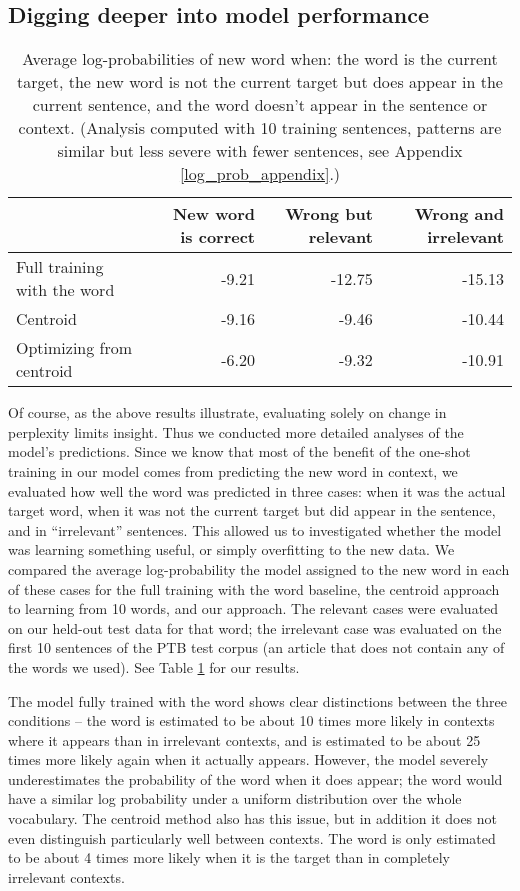 \documentclass{article}
\begin{document}
\subsection{Digging deeper into model performance} \label{digging_deeper}
\begin{table}[ht]
\centering
\begin{tabular}{|l|rrr|}
  \hline
  & New word is correct & Wrong but relevant & Wrong and irrelevant \\ 
  \hline
  Full training with the word & -9.21 & -12.75 & -15.13 \\ 
  Centroid & -9.16 & -9.46 & -10.44 \\ 
  Optimizing from centroid & -6.20 & -9.32 & -10.91 \\ 
   \hline
\end{tabular}
\caption{Average log-probabilities of new word when: the word is the current target, the new word is not the current target but does appear in the current sentence, and the word doesn't appear in the sentence or context. (Analysis computed with 10 training sentences, patterns are similar but less severe with fewer sentences, see Appendix \ref{log_prob_appendix}.)} \label{word_prob_table} 
\end{table}
Of course, as the above results illustrate, evaluating solely on change in perplexity limits insight. Thus we conducted more detailed analyses of the model's predictions. Since we know that most of the benefit of the one-shot training in our model comes from predicting the new word in context, we evaluated how well the word was predicted in three cases: when it was the actual target word, when it was not the current target but did appear in the sentence, and in ``irrelevant'' sentences. This allowed us to investigated whether the model was learning something useful, or simply overfitting to the new data. We compared the average log-probability the model assigned to the new word in each of these cases for the full training with the word baseline, the centroid approach to learning from 10 words, and our approach. The relevant cases were evaluated on our held-out test data for that word; the irrelevant case was evaluated on the first 10 sentences of the PTB test corpus (an article that does not contain any of the words we used). See Table \ref{word_prob_table} for our results. \par 
The model fully trained with the word shows clear distinctions between the three conditions -- the word is estimated to be about 10 times more likely in contexts where it appears than in irrelevant contexts, and is estimated to be about 25 times more likely again when it actually appears. However, the model severely underestimates the probability of the word when it does appear; the word would have a similar log probability under a uniform distribution over the whole vocabulary. The centroid method also has this issue, but in addition it does not even distinguish particularly well between contexts. The word is only estimated to be about 4 times more likely when it is the target than in completely irrelevant contexts. \par
\end{document}
